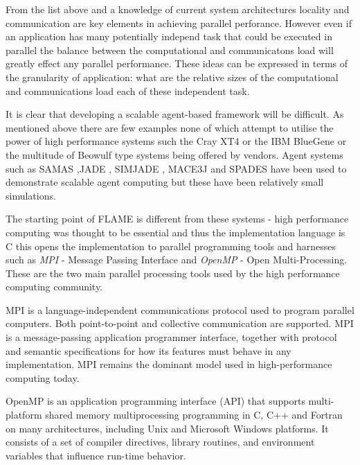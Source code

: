 From the list above and a knowledge of current system architectures locality and communication are key elements in achieving parallel perforance. However even if an application has many potentially independ task that could be executed in parallel the balance between the computational and communicatons load will greatly effect any parallel performance. These ideas can be expressed in terms of the granularity of application: what are the relative sizes of the computational and communications load each of these independent task.

It is clear that developing a scalable agent-based framework will be difficult. As mentioned above there are few examples none of which attempt to utilise the power of high performance systems such the Cray XT4 or the IBM BlueGene or the multitude of Beowulf type systems being offered by vendors. Agent systems such as SAMAS \cite{SAMAS},JADE \cite {JADE}, SIMJADE \cite{SIMJADE}, MACE3J \cite{MACE3J} and SPADES \cite{SPADES} have been used to demonstrate scalable agent computing but these have been relatively small simulations.

The starting point of FLAME is different from these systems - high performance computing was thought to be essential and thus the implementation language is C this opens the implementation to parallel programming tools and harnesses such as \textit{MPI} - Message Passing Interface and \textit{OpenMP} - Open Multi-Processing. These are the two main parallel processing tools used by the high performance computing community. 

MPI is a language-independent communications protocol used to program parallel computers. Both point-to-point and collective communication are supported. MPI is a message-passing application programmer interface, together with protocol and semantic specifications for how its features must behave in any implementation. MPI remains the dominant model used in high-performance computing today.

OpenMP is an application programming interface (API) that supports multi-platform shared memory multiprocessing programming in C, C++ and Fortran on many architectures, including Unix and Microsoft Windows platforms. It consists of a set of compiler directives, library routines, and environment variables that influence run-time behavior.

